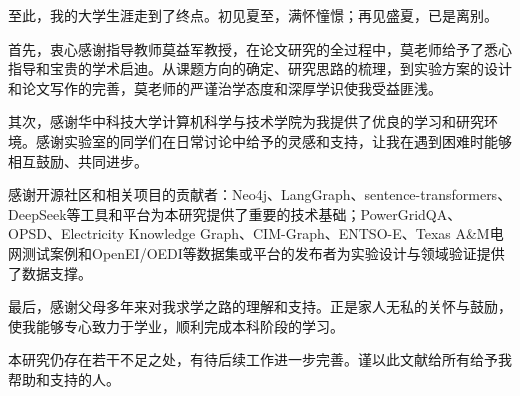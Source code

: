 
至此，我的大学生涯走到了终点。初见夏至，满怀憧憬；再见盛夏，已是离别。

首先，衷心感谢指导教师莫益军教授，在论文研究的全过程中，莫老师给予了悉心指导和宝贵的学术启迪。从课题方向的确定、研究思路的梳理，到实验方案的设计和论文写作的完善，莫老师的严谨治学态度和深厚学识使我受益匪浅。

其次，感谢华中科技大学计算机科学与技术学院为我提供了优良的学习和研究环境。感谢实验室的同学们在日常讨论中给予的灵感和支持，让我在遇到困难时能够相互鼓励、共同进步。

感谢开源社区和相关项目的贡献者：Neo4j、LangGraph、sentence-transformers、DeepSeek等工具和平台为本研究提供了重要的技术基础；PowerGridQA、OPSD、Electricity Knowledge Graph、CIM-Graph、ENTSO-E、Texas A\&M电网测试案例和OpenEI/OEDI等数据集或平台的发布者为实验设计与领域验证提供了数据支撑。

最后，感谢父母多年来对我求学之路的理解和支持。正是家人无私的关怀与鼓励，使我能够专心致力于学业，顺利完成本科阶段的学习。

本研究仍存在若干不足之处，有待后续工作进一步完善。谨以此文献给所有给予我帮助和支持的人。

